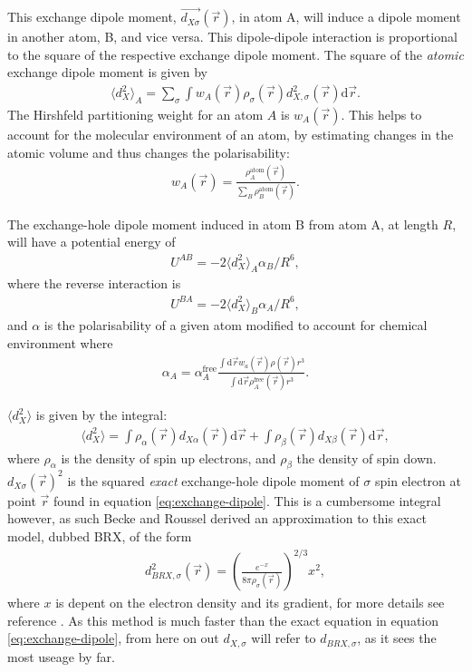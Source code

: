 \documentclass[10pt,a4paper,twocolumn,twoside]{extarticle}
\renewcommand{\d}{\text{d}}
\begin{document}
	This exchange dipole moment, $\vec{d_{X\sigma}}(\vec{r})$, in atom A, will induce a dipole moment in another atom, B, and vice versa. This dipole-dipole interaction is proportional to the square of the respective exchange dipole moment. The square of the \emph{atomic} exchange dipole moment is given by
	\begin{align}
		\langle d_{X}^2 \rangle_A = \sum_\sigma \int  w_A(\vec{r}) \rho_\sigma(\vec{r}) d_{X,\sigma}^2(\vec{r}) \d\vec{r}.
	\end{align}
	The Hirshfeld partitioning\cite{Hirshfeld} weight for an atom $A$ is $w_A(\vec{r})$. This helps to account for the molecular environment of an atom, by estimating changes in the atomic volume and thus changes the polarisability:
	\begin{align}
		w_A(\vec{r}) = \frac{\rho_A^\text{atom}(\vec{r})}{\sum_B\rho_B^\text{atom}(\vec{r})}.
	\end{align}

	The exchange-hole dipole moment induced in atom B from atom A, at length $R$, will have a potential energy of 
	\begin{align}
		U^{AB} = -2\langle d_X^2 \rangle_A \alpha_B / R^6,
	\end{align} 
	where the reverse interaction is  
	\begin{align}
		U^{BA} = -2\langle d_X^2 \rangle_B \alpha_A / R^6,
	\end{align} 
	and $\alpha$ is the polarisability of a given atom modified to account for chemical environment where
	\begin{align}
		\alpha_A = \alpha_A^\text{free} \frac{\int\d\vec{r} w_a(\vec{r})\rho(\vec{r})r^3}{\int \d\vec{r}\rho_A^\text{free}(\vec{r})r^3}.
	\end{align}
	
	$\langle d_X^2 \rangle$ is given by the integral:
	\begin{align}
		\langle d_X^2 \rangle = \int \rho_\alpha(\vec{r}) d_{X\alpha}(\vec{r}) \d \vec{r} +
								\int \rho_\beta(\vec{r}) d_{X\beta}(\vec{r}) \d \vec{r},
	\end{align}
	where $\rho_\alpha$ is the density of spin up electrons, and $\rho_\beta$ the density of spin down. $d_{X\sigma}(\vec{r})^2$ is the squared \emph{exact} exchange-hole dipole moment of $\sigma$ spin electron at point $\vec{r}$ found in equation \ref{eq:exchange-dipole}. This is a cumbersome integral however, as such Becke and Roussel derived an approximation to this exact model, dubbed BRX, of the form
	\begin{align}
		d_{BRX,\sigma}^2(\vec{r}) = \left(\frac{e^{-x}}{8\pi\rho_\sigma(\vec{r})}\right)^{2/3}x^2,
	\end{align} 
	where $x$ is depent on the electron density and its gradient, for more details see reference \cite{XDM-Original}. As this method is much faster than the exact equation in equation \ref{eq:exchange-dipole}, from here on out $d_{X,\sigma}$ will refer to $d_{BRX,\sigma}$, as it sees the most useage by far. 
\end{document}

